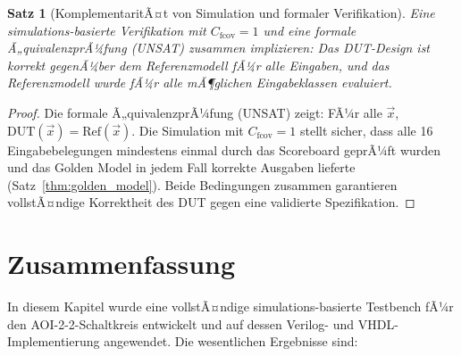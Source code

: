﻿\documentclass[12pt,a4paper]{report}
\newtheorem{theorem}{Satz}[section]
\begin{document}
\begin{theorem}[KomplementaritÃ¤t von Simulation und formaler Verifikation]
\label{thm:komplementaritaet}
Eine simula\-tions-basierte Verifikation mit $C_{\mathrm{fcov}} = 1$
\emph{und} eine formale Ã„quivalenzprÃ¼fung (UNSAT) zusammen implizieren:
Das DUT-Design ist korrekt gegenÃ¼ber dem Referenzmodell fÃ¼r alle Eingaben,
und das Referenzmodell wurde fÃ¼r alle mÃ¶glichen Eingabeklassen evaluiert.
\end{theorem}

\begin{proof}
Die formale Ã„quivalenzprÃ¼fung (UNSAT) zeigt: FÃ¼r alle $\vec{x}$, $\mathrm{DUT}(\vec{x}) = \mathrm{Ref}(\vec{x})$.
Die Simulation mit $C_{\mathrm{fcov}} = 1$ stellt sicher, dass alle 16
Eingabebelegungen mindestens einmal durch das Scoreboard geprÃ¼ft wurden und
das Golden Model in jedem Fall korrekte Ausgaben lieferte
(Satz~\ref{thm:golden_model}). Beide Bedingungen zusammen garantieren
vollstÃ¤ndige Korrektheit des DUT gegen eine validierte Spezifikation.
\end{proof}

\section{Zusammenfassung}
\label{subsec:pyuvm_zusammenfassung}

In diesem Kapitel wurde eine vollstÃ¤ndige simulations-basierte Testbench fÃ¼r
den AOI-2-2-Schaltkreis entwickelt und auf dessen Verilog- und
VHDL-Implementierung angewendet. Die wesentlichen Ergebnisse sind:
\end{document}
